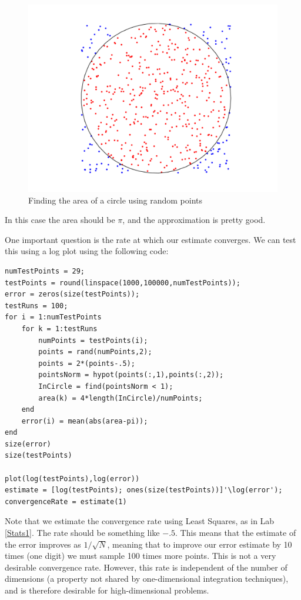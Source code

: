 \begin{figure}
\begin{center}
\includegraphics[scale = .4]{./Figures/MCCircle}
\caption{Finding the area of a circle using random points}
\label{Fig:MCCircle}
\end{center}
\end{figure}

In this case the area should be $\pi$, and the approximation is pretty good.

One important question is the rate at which our estimate converges. We can test this using a log plot using the following code:
\begin{matlab}
\begin{lstlisting}[style=matlab]
numTestPoints = 29;
testPoints = round(linspace(1000,100000,numTestPoints));
error = zeros(size(testPoints));
testRuns = 100;
for i = 1:numTestPoints
    for k = 1:testRuns
        numPoints = testPoints(i);
        points = rand(numPoints,2);
        points = 2*(points-.5);
        pointsNorm = hypot(points(:,1),points(:,2));
        InCircle = find(pointsNorm < 1);
        area(k) = 4*length(InCircle)/numPoints;
    end
    error(i) = mean(abs(area-pi));
end
size(error)
size(testPoints)

plot(log(testPoints),log(error))
estimate = [log(testPoints); ones(size(testPoints))]'\log(error');
convergenceRate = estimate(1)
\end{lstlisting}
\end{matlab}

Note that we estimate the convergence rate using Least Squares, as in Lab \ref{Stats1}. The rate should be something like $-.5$. This means that the estimate of the error improves as $1/\sqrt{N}$, meaning that to improve our error estimate by 10 times (one digit) we must sample 100 times more points. This is not a very desirable convergence rate. However, this rate is independent of the number of dimensions (a property not shared by one-dimensional integration techniques), and is therefore desirable for high-dimensional problems.

